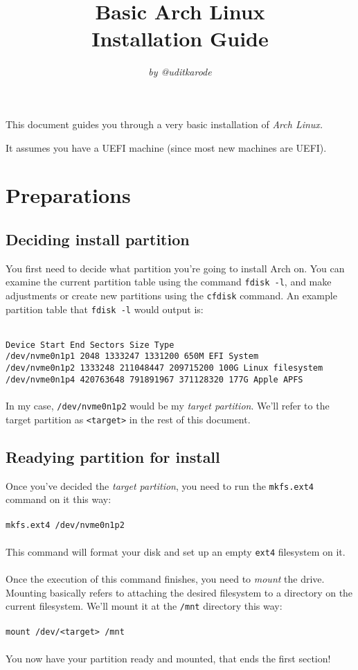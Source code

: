 \documentclass{article}
\author{\textit{by @uditkarode}}
\title{\textbf{Basic Arch Linux \\ Installation Guide}}
\begin{document}
\maketitle

This document guides you through a very basic installation of \textit{Arch Linux.}

It assumes you have a UEFI machine (since most new machines are UEFI).

\section{Preparations}
\subsection{Deciding install partition}
You first need to decide what partition you're going to install Arch on. You can examine the current partition table using the command \texttt{fdisk -l}, and make adjustments or create new partitions using the \texttt{cfdisk} command. An example partition table that \texttt{fdisk -l} would output is:  

\texttt{
\\
Device             Start        End   Sectors  Size Type\\
/dev/nvme0n1p1      2048    1333247   1331200  650M EFI System\\
/dev/nvme0n1p2   1333248  211048447 209715200  100G Linux filesystem\\
/dev/nvme0n1p4 420763648  791891967 371128320  177G Apple APFS\\
}
\\
In my case, \texttt{/dev/nvme0n1p2} would be my \textit{target partition}. We'll refer to the target partition as \texttt{<target>} in the rest of this document.

\subsection{Readying partition for install}
Once you've decided the \textit{target partition}, you need to run the \texttt{mkfs.ext4} command on it this way:
\\\\
\texttt{mkfs.ext4 /dev/nvme0n1p2}
\\\\
This command will format your disk and set up an empty \texttt{ext4} filesystem on it.\\\\ Once the execution of this command finishes, you need to \textit{mount} the drive. Mounting basically refers to attaching the desired filesystem to a directory on the current filesystem. We'll mount it at the \texttt{/mnt} directory this way:
\\\\
\texttt{mount /dev/<target> /mnt}
\\\\
You now have your partition ready and mounted, that ends the first section!
\end{document}
